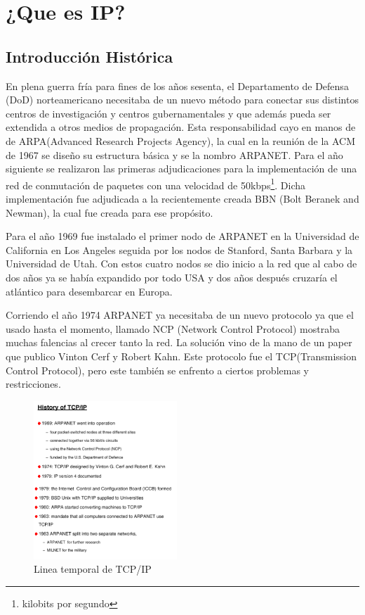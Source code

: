 \documentclass[11pt,a4paper]{article}
\author{Ignacio Perez Laborda}
\begin{document}


\tableofcontents

\listoffigures

\newpage

\section{¿Que es IP?}
\subsection{Introducción Histórica}
En plena guerra fría para fines de los años sesenta, el Departamento de Defensa (DoD) norteamericano
necesitaba de un nuevo método para conectar sus distintos centros de investigación y centros 
gubernamentales y que además pueda ser extendida a otros medios de propagación. Esta responsabilidad 
cayo en manos de de ARPA(Advanced Research Projects Agency), la cual en la
reunión de la ACM de 1967 se diseño su estructura básica y se la nombro ARPANET. Para el año 
siguiente se realizaron las primeras adjudicaciones para la implementación de una red de conmutación
de paquetes con una velocidad de 50kbps\footnote{kilobits por segundo}. Dicha implementación fue
adjudicada a la recientemente creada BBN (Bolt Beranek and Newman), la cual fue creada para ese
propósito.\par
Para el año 1969 fue instalado el primer nodo de ARPANET en la Universidad de California en Los
Angeles seguida por los nodos de Stanford, Santa Barbara y la Universidad de Utah. Con estos cuatro
nodos se dio inicio a la red que al cabo de dos años ya se había expandido por todo USA y dos años
después cruzaría el atlántico para desembarcar en Europa.\par
Corriendo el año 1974 ARPANET ya necesitaba de un nuevo protocolo ya que el usado hasta el momento, 
llamado NCP (Network Control Protocol) mostraba muchas falencias al crecer tanto la red. La solución
vino de la mano de un paper que publico Vinton Cerf y Robert Kahn. Este protocolo fue el 
TCP(Transmission Control Protocol), pero este también se enfrento a ciertos problemas y 
restricciones.
\begin{figure}
\centering
  \includegraphics[width=0.48\textwidth]{historiaTCPIP.png}
 \caption[Historia de TCP/IP]{Linea temporal de TCP/IP}
\vspace{-15pt}
\end{figure}
\end{document}
